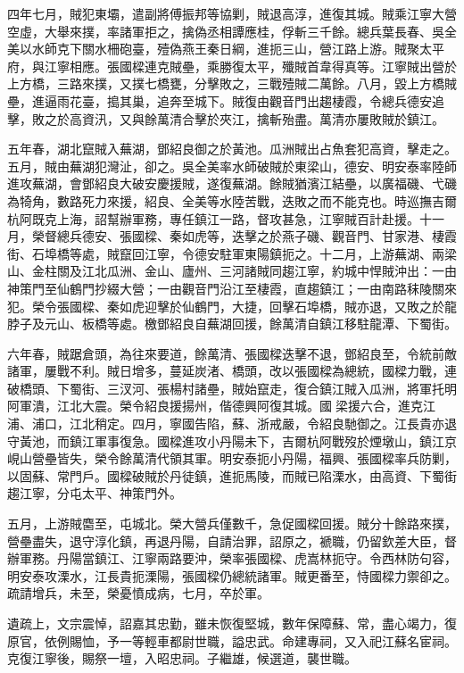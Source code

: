 \begin{pinyinscope}
四年七月，賊犯東壩，遣副將傅振邦等協剿，賊退高淳，進復其城。賊乘江寧大營空虛，大舉來撲，率諸軍拒之，擒偽丞相譚應桂，俘斬三千餘。總兵葉長春、吳全美以水師克下關水柵砲臺，殪偽燕王秦日綱，進扼三山，營江路上游。賊聚太平府，與江寧相應。張國樑連克賊壘，乘勝復太平，殲賊首韋得真等。江寧賊出營於上方橋，三路來撲，又撲七橋甕，分擊敗之，三戰殪賊二萬餘。八月，毀上方橋賊壘，進逼雨花臺，搗其巢，追奔至城下。賊復由觀音門出趨棲霞，令總兵德安追擊，敗之於高資汛，又與餘萬清合擊於夾江，擒斬殆盡。萬清亦屢敗賊於鎮江。

五年春，湖北竄賊入蕪湖，鄧紹良御之於黃池。瓜洲賊出占魚套犯高資，擊走之。五月，賊由蕪湖犯灣沚，卻之。吳全美率水師破賊於東梁山，德安、明安泰率陸師進攻蕪湖，會鄧紹良大破安慶援賊，遂復蕪湖。餘賊猶濱江結壘，以廣福磯、弋磯為犄角，數路死力來援，紹良、全美等水陸苦戰，迭敗之而不能克也。時巡撫吉爾杭阿既克上海，詔幫辦軍務，專任鎮江一路，督攻甚急，江寧賊百計赴援。十一月，榮督總兵德安、張國樑、秦如虎等，迭擊之於燕子磯、觀音門、甘家港、棲霞街、石埠橋等處，賊竄回江寧，令德安駐軍東陽鎮扼之。十二月，上游蕪湖、兩梁山、金柱關及江北瓜洲、金山、廬州、三河諸賊同趨江寧，約城中悍賊沖出：一由神策門至仙鶴門抄綴大營；一由觀音門沿江至棲霞，直趨鎮江；一由南路秣陵關來犯。榮令張國樑、秦如虎迎擊於仙鶴門，大捷，回擊石埠橋，賊亦退，又敗之於龍脖子及元山、板橋等處。檄鄧紹良自蕪湖回援，餘萬清自鎮江移駐龍潭、下蜀街。

六年春，賊踞倉頭，為往來要道，餘萬清、張國樑迭擊不退，鄧紹良至，令統前敵諸軍，屢戰不利。賊日增多，蔓延炭渚、橋頭，改以張國樑為總統，國樑力戰，連破橋頭、下蜀街、三汊河、張楊村諸壘，賊始竄走，復合鎮江賊入瓜洲，將軍托明阿軍潰，江北大震。榮令紹良援揚州，偕德興阿復其城。國梁援六合，進克江浦、浦口，江北稍定。四月，寧國告陷，蘇、浙戒嚴，令紹良馳御之。江長貴亦退守黃池，而鎮江軍事復急。國樑進攻小丹陽未下，吉爾杭阿戰歿於煙墩山，鎮江京峴山營壘皆失，榮令餘萬清代領其軍。明安泰扼小丹陽，福興、張國樑率兵防剿，以固蘇、常門戶。國樑破賊於丹徒鎮，進扼馬陵，而賊已陷溧水，由高資、下蜀街趨江寧，分屯太平、神策門外。

五月，上游賊麕至，屯城北。榮大營兵僅數千，急促國樑回援。賊分十餘路來撲，營壘盡失，退守淳化鎮，再退丹陽，自請治罪，詔原之，褫職，仍留欽差大臣，督辦軍務。丹陽當鎮江、江寧兩路要沖，榮率張國樑、虎嵩林扼守。令西林防句容，明安泰攻溧水，江長貴扼溧陽，張國樑仍總統諸軍。賊更番至，恃國樑力禦卻之。疏請增兵，未至，榮憂憤成病，七月，卒於軍。

遺疏上，文宗震悼，詔嘉其忠勤，雖未恢復堅城，數年保障蘇、常，盡心竭力，復原官，依例賜恤，予一等輕車都尉世職，謚忠武。命建專祠，又入祀江蘇名宦祠。克復江寧後，賜祭一壇，入昭忠祠。子繼雄，候選道，襲世職。


\end{pinyinscope}
